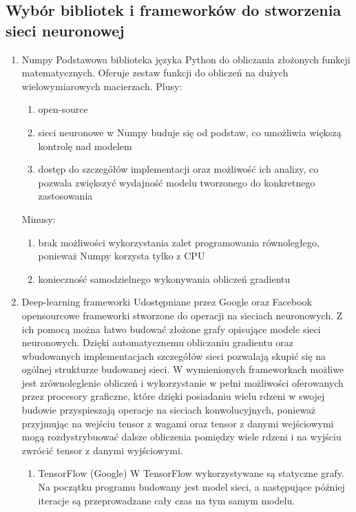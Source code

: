 \documentclass[polish,12pt]{aghthesis}
\begin{document}
\subsection{Wybór bibliotek i frameworków do stworzenia sieci neuronowej}
\begin{enumerate}
    \item Numpy
    \newline Podstawowa biblioteka języka Python do obliczania złożonych funkcji matematycznych. Oferuje zestaw funkcji do obliczeń na dużych wielowymiarowych macierzach.
    \newline Plusy:
    \begin{enumerate}
        \item open-source
        \item sieci neuronowe w Numpy buduje się od podstaw, co umożliwia większą kontrolę nad modelem
        \item dostęp do szczegółów implementacji oraz możliwość ich analizy, co pozwala zwiększyć wydajność modelu tworzonego do konkretnego zastosowania
    \end{enumerate}
    Minusy:
    \begin{enumerate}
        \item brak możliwości wykorzystania zalet programowania równoległego, ponieważ Numpy korzysta tylko z CPU
        \item konieczność samodzielnego wykonywania obliczeń gradientu
    \end{enumerate}
    \item Deep-learning frameworki
    \newline Udostępniane przez Google oraz Facebook opensourcowe frameworki stworzone do operacji na sieciach neuronowych. Z ich pomocą można łatwo budować złożone grafy opisujące modele sieci neuronowych. Dzięki automatycznemu obliczaniu gradientu oraz wbudowanych implementacjach szczegółów sieci pozwalają skupić się na ogólnej strukturze budowanej sieci. W wymienionych frameworkach możliwe jest zrównoleglenie obliczeń i wykorzystanie w pełni możliwości oferowanych przez procesory graficzne, które dzięki posiadaniu wielu rdzeni w swojej budowie przyspieszają operacje na sieciach konwolucyjnych, ponieważ przyjmując na wejściu tensor z wagami oraz tensor z danymi wejściowymi mogą rozdystrybuować dalsze obliczenia pomiędzy wiele rdzeni i na wyjściu zwrócić tensor z danymi wyjściowymi. 
    \begin{enumerate}
        \item TensorFlow (Google)
        \newline W TensorFlow wykorzystywane są statyczne grafy. Na początku programu budowany jest model sieci, a następujące później iteracje są przeprowadzane cały czas na tym samym modelu.

\end{enumerate}
\end{enumerate}
\end{document}
